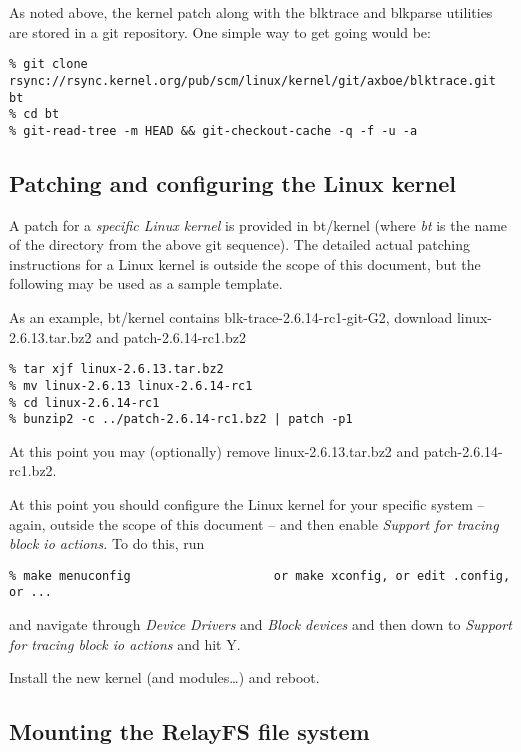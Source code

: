 \documentclass{article}
\begin{document}
As noted above, the kernel patch along with the blktrace and blkparse utilities are stored in a git repository. One simple way to get going would be:

\begin{verbatim}
% git clone rsync://rsync.kernel.org/pub/scm/linux/kernel/git/axboe/blktrace.git bt
% cd bt
% git-read-tree -m HEAD && git-checkout-cache -q -f -u -a
\end{verbatim}

\subsection{\label{sec:patching}Patching and configuring the Linux kernel}

A patch for a \emph{specific Linux kernel} is provided in bt/kernel (where
\emph{bt} is the name of the directory from the above git sequence). The
detailed actual patching instructions for a Linux kernel is outside the
scope of this document, but the following may be used as a sample template.

As an example, bt/kernel contains blk-trace-2.6.14-rc1-git-G2, download
linux-2.6.13.tar.bz2 and patch-2.6.14-rc1.bz2

\begin{verbatim}
% tar xjf linux-2.6.13.tar.bz2 
% mv linux-2.6.13 linux-2.6.14-rc1
% cd linux-2.6.14-rc1
% bunzip2 -c ../patch-2.6.14-rc1.bz2 | patch -p1
\end{verbatim}

At this point you may (optionally) remove linux-2.6.13.tar.bz2 and
patch-2.6.14-rc1.bz2.

At this point you should configure the Linux kernel for your specific
system -- again, outside the scope of this document -- and then enable
\emph{Support for tracing block io actions.} To do this, run

\begin{verbatim}
% make menuconfig                    or make xconfig, or edit .config, or ...
\end{verbatim}

and navigate through \emph{Device Drivers} and \emph{Block devices}
and then down to \emph{Support for tracing block io actions} and hit Y.

Install the new kernel (and modules\ldots) and reboot. 

\subsection{\label{sec:mount}Mounting the RelayFS file system}
\end{document}
